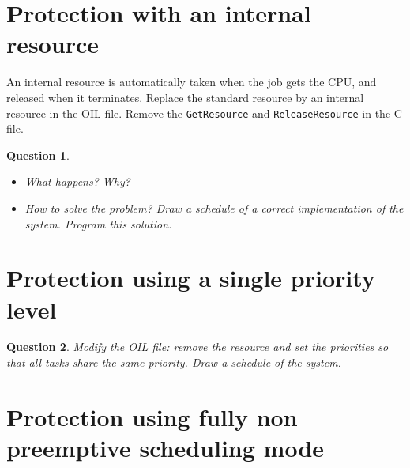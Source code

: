 \documentclass[11pt]{report}
\newtheorem{ex}{Question}
\begin{document}




\section{Protection with an internal resource}

An internal resource is automatically taken when the job gets the CPU, and released when it terminates. Replace the standard resource by an internal resource in the OIL file. Remove the \texttt{GetResource} and \texttt{ReleaseResource} in the C file.

\begin{ex}~
  \begin{itemize}
    \item
      What happens? Why?
    \item
      How to solve the problem? Draw a schedule of a correct implementation of the system. Program this solution.
  \end{itemize}
\end{ex}


\section{Protection using a single priority level}

\begin{ex}
  Modify the OIL file: remove the resource and set the priorities so that all tasks share the same priority. Draw a schedule of the system.
\end{ex}

\section{Protection using fully non preemptive scheduling mode}
\end{document}

